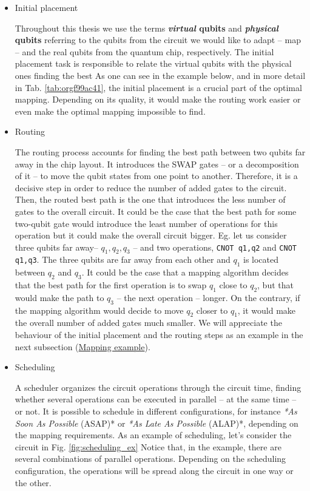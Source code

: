 \begin{itemize}
\item Initial placement
\label{sec:orgc6d61b2}

Throughout this thesis we use the terms \textbf{\emph{virtual} qubits} and \textbf{\emph{physical} qubits} referring to the qubits from the circuit we would like to adapt -- map -- and the real qubits from the quantum chip, respectively.
The initial placement task is responsible to relate the virtual qubits with the physical ones finding the best 
As one can see in the example below, and in more detail in Tab. \ref{tab:orgf99ac41}, the initial placement is a crucial part of the optimal mapping.
Depending on its quality, it would make the routing work easier or even make the optimal mapping impossible to find.

\item Routing
\label{sec:org9d6182b}

The routing process accounts for finding the best path between two qubits far away in the chip layout.
It introduces the SWAP gates -- or a decomposition of it -- to move the qubit states from one point to another.
Therefore, it is a decisive step in order to reduce the number of added gates to the circuit.
Then, the routed best path is the one that introduces the less number of gates to the overall circuit.
It could be the case that the best path for some two-qubit gate would introduce the least number of operations for this operation but it could make the overall circuit bigger.
Eg. let us consider three qubits far away-- \(q_1, q_2, q_3\) -- and two operations, \texttt{CNOT q1,q2} and \texttt{CNOT q1,q3}.
The three qubits are far away from each other and \(q_1\) is located between \(q_2\) and \(q_3\).
It could be the case that a mapping algorithm decides that the best path for the first operation is to swap \(q_1\) close to \(q_2\), but that would make the path to \(q_3\) -- the next operation -- longer.
On the contrary, if the mapping algorithm would decide to move \(q_2\) closer to \(q_1\), it would make the overall number of added gates much smaller.
We will appreciate the behaviour of the initial placement and the routing steps as an example in the next subsection (\hyperref[sec:org496427f]{Mapping example}).

\item Scheduling
\label{sec:orgf946ae2}

A scheduler organizes the circuit operations through the circuit time,
finding whether several operations can be executed in parallel -- at the same time -- or not.
It is possible to schedule in different configurations, for instance \emph{*As Soon As Possible} (ASAP)* or \emph{*As Late As Possible} (ALAP)*, depending on the mapping requirements.
As an example of scheduling, let's consider the circuit in Fig. \ref{fig:scheduling_ex}
Notice that, in the example, there are several combinations of parallel operations.
Depending on the scheduling configuration,
the operations will be spread along the circuit in one way or the other.


\end{itemize}
